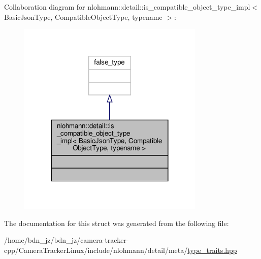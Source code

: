 Collaboration diagram for nlohmann\+:\+:detail\+:\+:is\+\_\+compatible\+\_\+object\+\_\+type\+\_\+impl$<$ Basic\+Json\+Type, Compatible\+Object\+Type, typename $>$\+:\nopagebreak
\begin{figure}[H]
\begin{center}
\leavevmode
\includegraphics[width=252pt]{structnlohmann_1_1detail_1_1is__compatible__object__type__impl__coll__graph}
\end{center}
\end{figure}


The documentation for this struct was generated from the following file\+:\begin{DoxyCompactItemize}
\item 
/home/bdn\+\_\+jz/bdn\+\_\+jz/camera-\/tracker-\/cpp/\+Camera\+Tracker\+Linux/include/nlohmann/detail/meta/\hyperlink{type__traits_8hpp}{type\+\_\+traits.\+hpp}\end{DoxyCompactItemize}
